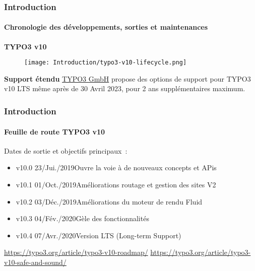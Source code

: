 
\begin{frame}[fragile]
	\frametitle{Introduction}
	\framesubtitle{Chronologie des développements, sorties et maintenances}

	\textbf{TYPO3 v10}

	\begin{figure}
		\texttt{[image: Introduction/typo3-v10-lifecycle.png]}
	\end{figure}

	\textbf{Support étendu}\newline
	\smaller
		\href{https://typo3.com}{TYPO3 GmbH} propose des options de support pour TYPO3
		v10 LTS même après de 30 Avril 2023, pour 2 ans supplémentaires maximum.
	\normalsize

\end{frame}


\begin{frame}[fragile]
	\frametitle{Introduction}
	\framesubtitle{Feuille de route TYPO3 v10}

	Dates de sortie et objectifs principaux~:

	\begin{itemize}

		\item v10.0 \tabto{1.1cm}23/Jui./2019\tabto{3.4cm}Ouvre la voie à de nouveaux concepts et APis
		\item v10.1 \tabto{1.1cm}01/Oct./2019\tabto{3.4cm}Améliorations routage et gestion des sites V2
		\item
			\begingroup
				\color{typo3orange}
		v10.2 \tabto{1.1cm}03/Déc./2019\tabto{3.4cm}Améliorations du moteur de rendu Fluid
			\endgroup
		\item v10.3 \tabto{1.1cm}04/Fév./2020\tabto{3.4cm}Gèle des fonctionnalités
		\item v10.4 \tabto{1.1cm}07/Avr./2020\tabto{3.4cm}Version LTS (Long-term Support)

	\end{itemize}

	\smaller
		\url{https://typo3.org/article/typo3-v10-roadmap/}\newline
		\url{https://typo3.org/article/typo3-v10-safe-and-sound/}
	\normalsize

\end{frame}

